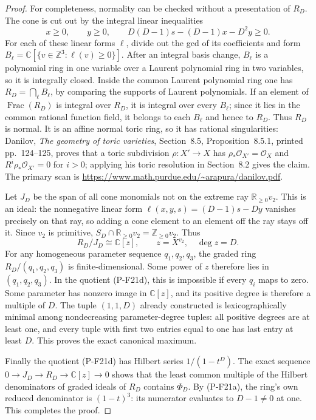 \begin{proof}
For completeness, normality can be checked without a presentation
of $R_D$. The cone is cut out by the integral linear inequalities
\[
 x\ge0,\qquad y\ge0,\qquad
 D(D-1)s-(D-1)x-D^2y\ge0.
\]
For each of these linear forms $\ell$, divide out the gcd of its
coefficients and form
$B_\ell=\mathbb C[\{v\in\mathbb Z^3:\ell(v)\ge0\}]$.
After an integral basis change, $B_\ell$ is a polynomial ring in
one variable over a Laurent polynomial ring in two variables, so
it is integrally closed. Inside the common Laurent polynomial
ring one has
$R_D=\bigcap_\ell B_\ell$, by comparing the supports of Laurent
polynomials. If an element of $\operatorname{Frac}(R_D)$ is integral
over $R_D$, it is integral over every $B_\ell$; since it lies in
the common rational function field, it belongs to each $B_\ell$
and hence to $R_D$. Thus $R_D$ is normal. It is an affine normal
toric ring, so it has rational singularities: Danilov,
\emph{The geometry of toric varieties}, Section~8.5,
Proposition~8.5.1, printed pp.~124--125, proves that a toric
subdivision $\rho:X'\to X$ has
$\rho_*\mathcal O_{X'}=\mathcal O_X$ and
$R^i\rho_*\mathcal O_{X'}=0$ for $i>0$; applying his toric
resolution in Section~8.2 gives the claim. The primary scan is
\url{https://www.math.purdue.edu/~arapura/danilov.pdf}.

Let $J_D$ be the span of all cone monomials not on the extreme ray
$\mathbb R_{\ge0}v_2$. This is an ideal: the nonnegative linear
form $\ell(x,y,s)=(D-1)s-Dy$ vanishes precisely on that ray,
so adding a cone element to an element off the ray stays off it.
Since $v_2$ is primitive, $S_D\cap\mathbb R_{\ge0}v_2
=\mathbb Z_{\ge0}v_2$. Thus
\[
 R_D/J_D\cong\mathbb C[z],\qquad z=X^{v_2},\quad\deg z=D.
 \tag{P-F21d}
\]
For any homogeneous parameter sequence $q_1,q_2,q_3$, the graded
ring $R_D/(q_1,q_2,q_3)$ is finite-dimensional. Some power of
$z$ therefore lies in $(q_1,q_2,q_3)$. In the quotient (P-F21d),
this is impossible if every $q_i$ maps to zero. Some parameter
has nonzero image in $\mathbb C[z]$, and its positive degree is
therefore a multiple of $D$. The tuple $(1,1,D)$ already
constructed is lexicographically minimal among nondecreasing
parameter-degree tuples: all positive degrees are at least one,
and every tuple with first two entries equal to one has last entry
at least $D$. This proves the exact canonical maximum.

Finally the quotient (P-F21d) has Hilbert series $1/(1-t^D)$.
The exact sequence $0\to J_D\to R_D\to\mathbb C[z]\to0$
shows that the least common multiple of the Hilbert denominators
of graded ideals of $R_D$ contains $\Phi_D$. By (P-F21a), the
ring's own reduced denominator is $(1-t)^3$: its numerator
evaluates to $D-1\ne0$ at one. This completes the proof.
\end{proof}

